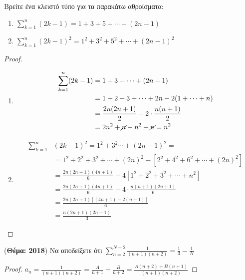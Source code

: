 \begin{multicols}{2}
\begin{enumerate}
    \item \label{ask:sums} \textcolor{Col1}{Βρείτε ένα κλειστό τύπο για τα 
        παρακάτω αθροίσματα: 
        \begin{enumerate}
          \item $ \sum_{k=1}^{n} (2k-1) = 1 + 3 + 5 + \cdots + (2n-1)  $
          \item $ \sum_{k=1}^{n} (2k-1)^{2} = 1^{2} + 3^{2} + 5^{2} 
            + \cdots + (2n-1)^{2}  $ 
      \end{enumerate}}
      \begin{proof}
      \item {}
        \begin{enumerate}
          \item \begin{align*}
              \sum_{k=1}^{n} (2k-1) &= 1 + 3 + \cdots + (2n-1) \\
                                    &=1 + 2 + 3 +\cdots +2n - 2(1+\cdots +n) \\
                                    &= \frac{2n(2n+1)}{2}-2 \cdot \frac{n(n+1)}{2} \\
                                    &=2n^{2}+\cancel{n}-n^{2}-\cancel{n} =n^{2}
            \end{align*}
          \item \begin{align*}
              \sum_{k=1}^{n}
              & (2k-1)^{2} =1^{2}+3^{2}\cdots + (2n-1)^{2} = \\
              &=1^{2}+2^{2}+3^{2}+\cdots +(2n)^{2}-[2^{2}+4^{2}+6^{2}+\cdots +
              (2n)^{2}] \\
              &= \frac{2n(2n+1)(4n+1)}{6} - 4[1^{2}+2^{2}+3^{2}+\cdots +n^{2}] \\
              &= \frac{2n(2n+1)(4n+1)}{6} - 4 \cdot \frac{n(n+1)(2n+1)}{6} \\
              &= \frac{2n(2n+1)[(4n+1)-2(n+1)]}{6} \\
              &= \frac{n(2n+1)(2n-1)}{3} 
            \end{align*}
        \end{enumerate}
      \end{proof}

    \item \label{ask:thema18sum} \textcolor{Col1}{({\bfseries Θέμα: 2018}) 
        Να αποδείξετε ότι $ \sum_{n=2}^{N-2} \frac{1}{(n+1)(n+2)} 
      = \frac{1}{3} - \frac{1}{N} $}
      \begin{proof}
      \item {}
        $ a_n = \frac{1}{(n+1)(n+2)} = \frac{A}{n+1} + \frac{B}{n+2} = 
        \frac{A(n+2)+B(n+1)}{(n+1)(n+2)} $


\end{proof}
\end{enumerate}
\end{multicols}
